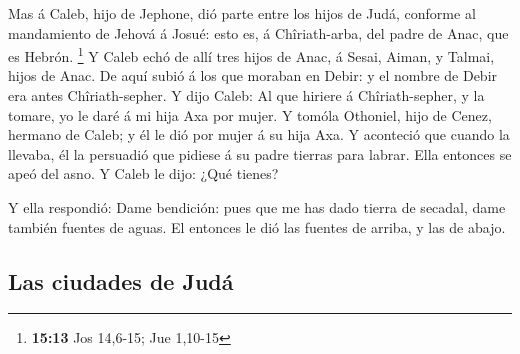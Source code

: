  Mas á Caleb, hijo de Jephone, dió parte entre los hijos de
Judá, conforme al mandamiento de Jehová á Josué: esto es, á
Chîriath-arba, del padre de Anac, que es Hebrón. \footnote{\textbf{15:13}
  Jos 14,6-15; Jue 1,10-15}  Y Caleb echó de allí tres
hijos de Anac, á Sesai, Aiman, y Talmai, hijos de Anac.  De
aquí subió á los que moraban en Debir: y el nombre de Debir era antes
Chîriath-sepher.  Y dijo Caleb: Al que hiriere á
Chîriath-sepher, y la tomare, yo le daré á mi hija Axa por mujer.
 Y tomóla Othoniel, hijo de Cenez, hermano de Caleb; y él
le dió por mujer á su hija Axa.  Y aconteció que cuando la
llevaba, él la persuadió que pidiese á su padre tierras para labrar.
Ella entonces se apeó del asno. Y Caleb le dijo: ¿Qué tienes?

 Y ella respondió: Dame bendición: pues que me has dado
tierra de secadal, dame también fuentes de aguas. El entonces le dió las
fuentes de arriba, y las de abajo.

\hypertarget{las-ciudades-de-juduxe1}{%
\subsection{Las ciudades de Judá}\label{las-ciudades-de-juduxe1}}

